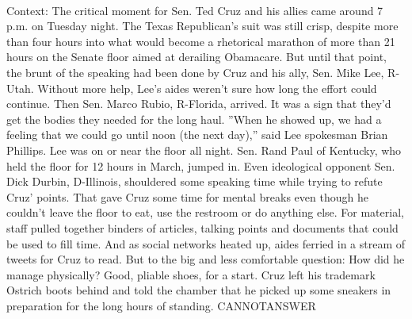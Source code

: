\documentclass[11pt,a4paper, onecolumn]{article}
\begin{document}
\\ Context: The critical moment for Sen. Ted Cruz and his allies came around 7 p.m. on Tuesday night. The Texas Republican's suit was still crisp, despite more than four hours into what would become a rhetorical marathon of more than 21 hours on the Senate floor aimed at derailing Obamacare. But until that point, the brunt of the speaking had been done by Cruz and his ally, Sen. Mike Lee, R-Utah. Without more help, Lee's aides weren't sure how long the effort could continue. Then Sen. Marco Rubio, R-Florida, arrived. It was a sign that they'd get the bodies they needed for the long haul. ''When he showed up, we had a feeling that we could go until noon (the next day),'' said Lee spokesman Brian Phillips. Lee was on or near the floor all night. Sen. Rand Paul of Kentucky, who held the floor for 12 hours in March, jumped in. Even ideological opponent Sen. Dick Durbin, D-Illinois, shouldered some speaking time while trying to refute Cruz' points. That gave Cruz some time for mental breaks even though he couldn't leave the floor to eat, use the restroom or do anything else. For material, staff pulled together binders of articles, talking points and documents that could be used to fill time. And as social networks heated up, aides ferried in a stream of tweets for Cruz to read. But to the big and less comfortable question: How did he manage physically? Good, pliable shoes, for a start. Cruz left his trademark Ostrich boots behind and told the chamber that he picked up some sneakers in preparation for the long hours of standing. CANNOTANSWER
\end{document}
